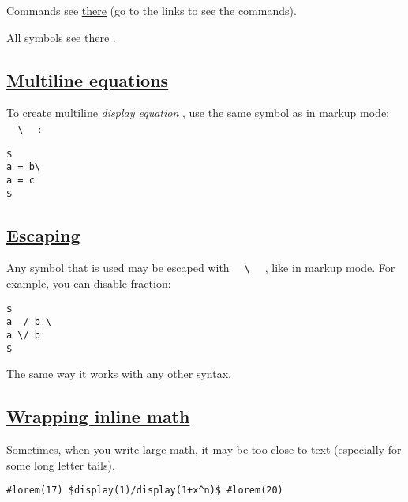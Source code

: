 Commands see
\href{https://typst.app/docs/reference/math/\#definitions}{there} (go to
the links to see the commands).

All symbols see
\href{https://typst.app/docs/reference/symbols/sym/}{there} .

\subsection{\texorpdfstring{\hyperref[multiline-equations]{Multiline
equations}}{Multiline equations}}\label{multiline-equations}

To create multiline \emph{display equation} , use the same symbol as in
markup mode: \texttt{\ }{\texttt{\ \textbackslash{}\ }}\texttt{\ } :

\begin{verbatim}
$
a = b\
a = c
$
\end{verbatim}

\pandocbounded{}

\subsection{\texorpdfstring{\hyperref[escaping]{Escaping}}{Escaping}}\label{escaping}

Any symbol that is used may be escaped with
\texttt{\ }{\texttt{\ \textbackslash{}\ }}\texttt{\ } , like in markup
mode. For example, you can disable fraction:

\begin{verbatim}
$
a  / b \
a \/ b
$
\end{verbatim}

\pandocbounded{}

The same way it works with any other syntax.

\subsection{\texorpdfstring{\hyperref[wrapping-inline-math]{Wrapping
inline math}}{Wrapping inline math}}\label{wrapping-inline-math}

Sometimes, when you write large math, it may be too close to text
(especially for some long letter tails).

\begin{verbatim}
#lorem(17) $display(1)/display(1+x^n)$ #lorem(20)
\end{verbatim}

